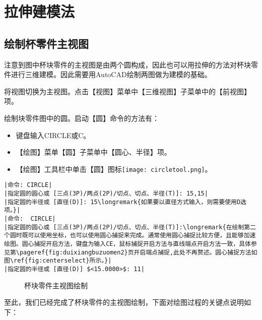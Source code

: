 \section{拉伸建模法}
\subsection{绘制杯零件主视图}
注意到图中杯块零件的主视图是由两个圆构成，因此也可以用拉伸的方法对杯块零件进行三维建模。因此需要用AutoCAD绘制两图做为建模的基础。
\begin{procedure}
\item 将视图切换为主视图。点击【视图】菜单中【三维视图】子菜单中的【前视图】项。
\item 绘制块零件图中的圆。启动【圆】命令的方法有：
\begin{itemize}
\item 键盘输入CIRCLE或C。
\item 【绘图】菜单【圆】子菜单中【圆心、半径】项。
\item 【绘图】工具栏中单击【圆】图标\texttt{[image: circletool.png]}。
\end{itemize}
\begin{lstlisting}
|命令: CIRCLE|
|指定圆的圆心或 [三点(3P)/两点(2P)/切点、切点、半径(T)]: 15,15|
|指定圆的半径或 [直径(D)]: 15\longremark{如果要以直径方式输入，则需要使用D选项。}|
|命令:  CIRCLE|
|指定圆的圆心或 [三点(3P)/两点(2P)/切点、切点、半径(T)]:\longremark{在绘制第二个圆时既可以使用坐标，也可以使用圆心捕捉来完成。通常使用圆心捕捉比较方便，且能够加速绘图。圆心捕捉开启方法，键盘为输入CE，鼠标捕捉开启方法与直线端点开启方法一致，具体参见第\pageref{fig:duixiangbuzuomen2}页开启端点捕捉,此处不再赘述。圆心捕捉方法如图\ref{fig:centerselect}所示。}|
|指定圆的半径或 [直径(D)] $<15.0000>$: 11|
\end{lstlisting}
\begin{figure}[htbp]
\centering
{}\hspace{20pt}
\caption{杯块零件主视图绘制}
\end{figure}
\end{procedure}

至此，我们已经完成了杯块零件的主视图绘制，下面对绘图过程的关键点说明如下：
\showremarks

